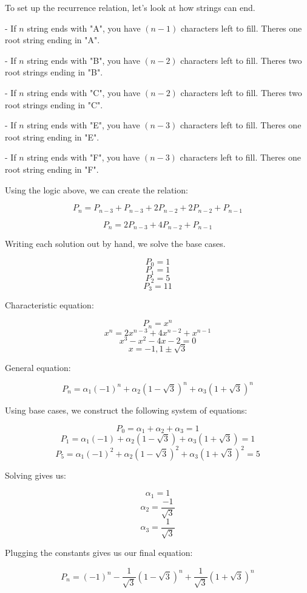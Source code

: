 \begin{solution}

To set up the recurrence relation, let's look at how strings can end.

- If $n$ string ends with "A", you have $(n-1)$ characters left to fill. Theres one root string ending in "A".
\newline

- If $n$ string ends with "B", you have $(n-2)$ characters left to fill. Theres two root strings ending in "B".
\newline

- If $n$ string ends with "C", you have $(n-2)$ characters left to fill. Theres two root strings ending in "C".
\newline

- If $n$ string ends with "E", you have $(n-3)$ characters left to fill. Theres one root string ending in "E".
\newline

- If $n$ string ends with "F", you have $(n-3)$ characters left to fill. Theres one root string ending in "F".
\newline

Using the logic above, we can create the relation:

\[ P_{n} = P_{n-3} + P_{n-3} + 2P_{n-2} + 2P_{n-2} + P_{n-1} \]

\[ P_{n} = 2P_{n-3} + 4P_{n-2} + P_{n-1} \]

Writing each solution out by hand, we solve the base cases.

\[ P_{0} = 1 \]
\[ P_{1} = 1 \]
\[ P_{2} = 5 \]
\[ P_{3} = 11 \]

Characteristic equation:

\[ P_{n} = x^{n} \]
\[ x^{n} = 2x^{n-3} + 4x^{n-2} + x^{n-1} \]
\[ x^{3} - x^{2} - 4x - 2 = 0 \]
\[ x = -1, 1 \pm \sqrt{3} \]

General equation:

\[ P_{n} = \alpha_{1}(-1)^{n} + \alpha_{2}(1-\sqrt{3})^{n} + \alpha_{3}(1 + \sqrt{3})^{n} \]

Using base cases, we construct the following system of equations:

\[ P_{0} = \alpha_{1} + \alpha_{2} + \alpha_{3} = 1 \]
\[ P_{1} = \alpha_{1}(-1) + \alpha_{2}(1-\sqrt{3}) + \alpha_{3}(1+\sqrt{3}) = 1 \]
\[ P_{5} = \alpha_{1}(-1)^{2} + \alpha_{2}(1-\sqrt{3})^{2} + \alpha_{3}(1+\sqrt{3})^{2} = 5 \]

Solving gives us:

\[ \alpha_{1} = 1 \]
\[ \alpha_{2} = \frac{-1}{\sqrt{3}} \]
\[ \alpha_{3} = \frac{1}{\sqrt{3}} \]

Plugging the constants gives us our final equation:

\[ P_{n} = (-1)^{n} - \frac{1}{\sqrt{3}}(1-\sqrt{3})^{n} + \frac{1}{\sqrt{3}}(1 + \sqrt{3})^{n} \]


\end{solution}
